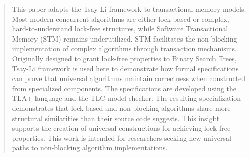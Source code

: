 \begin{abstract}
This paper adapts the Tsay-Li framework to transactional memory models. Most modern concurrent algorithms are either lock-based or complex, hard-to-understand lock-free structures, while Software Transactional Memory (STM) remains underutilized. STM facilitates the non-blocking implementation of complex algorithms through transaction mechanisms. Originally designed to grant lock-free properties to Binary Search Trees, Tsay-Li framework is used here to demonstrate how formal specifications can prove that universal algorithms maintain correctness when constructed from specialized components. The specifications are developed using the TLA+ language and the TLC model checker. The resulting specialization demonstrates that lock-based and non-blocking algorithms share more structural similarities than their source code suggests. This insight supports the creation of universal constructions for achieving lock-free properties. This work is intended for researchers seeking new universal paths to non-blocking algorithm implementations.
\end{abstract}
